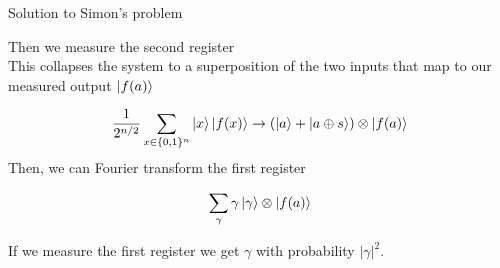 \documentclass[aspectratio=1610]{beamer}					%
\begin{document}
\begin{frame}{Solution to Simon's problem}

Then we measure the second register\\
\vspace{0.1in}
This collapses the system to a superposition of the two inputs that map to our measured output $\ket{f(a)}$

\begin{equation*}
\frac{1}{2^{n/2}}\sum_{x\in\{0,1\}^{n}}\ket{x}\ket{f(x)} \rightarrow \left(\ket{a}+\ket{a\oplus s}\right)\otimes \ket{f(a)}
\end{equation*}
\vspace{0.1in}
Then, we can Fourier transform the first register

\begin{equation*}
\sum_{\gamma}\gamma\ket{\gamma}\otimes \ket{f(a)}
\end{equation*}

If we measure the first register we get $\gamma$ with probability $|\gamma|^{2}$.

\end{frame}
\end{document}
